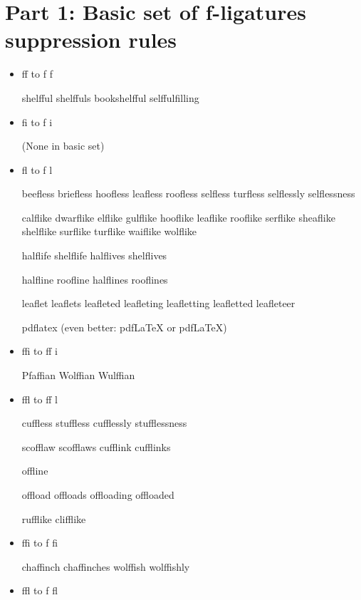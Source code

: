 


\section*{Part 1: Basic set of f-ligatures suppression rules}


\begin{itemize}

\item ff to f\kern0pt f

shelfful shelffuls bookshelfful selffulfilling


\item fi to f\kern0pt i

(None in basic set)

\item fl to f\kern0pt l

beefless briefless hoofless leafless roofless selfless turfless selflessly selflessness

calflike dwarflike elflike gulflike hooflike leaflike rooflike serflike sheaflike shelflike surflike turflike waiflike wolflike

halflife shelflife
halflives shelflives

halfline roofline
halflines rooflines

leaflet leaflets leafleted leafleting leafletting leafletted leafleteer

pdflatex (even better: pdfLaTeX or pdf\LaTeX)


\item ffi to ff\kern0pt i

Pfaffian Wolffian Wulffian


\item ffl to ff\kern0pt l

cuffless stuffless cufflessly stufflessness

scofflaw scofflaws cufflink cufflinks

offline

offload offloads offloading offloaded

rufflike clifflike


\item ffi to f\kern0pt fi

chaffinch chaffinches wolffish wolffishly

\item ffl to f\kern0pt fl


\end{itemize}

